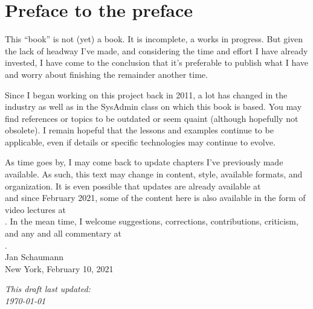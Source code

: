 \chapter{Preface to the preface}

This ``book'' is not (yet) a book.  It is incomplete,
a works in progress.  But given the lack of headway
I've made, and considering the time and effort I have
already invested, I have come to the conclusion that
it's preferable to publish what I have and worry about
finishing the remainder another time.

Since I began working on this project back in 2011, a
lot has changed in the industry as well as in the
SysAdmin class on which this book is based.  You may
find references or topics to be outdated or seem
quaint (although hopefully not obsolete).  I remain
hopeful that the lessons and examples continue to be
applicable, even if details or specific technologies
may continue to evolve.

As time goes by, I may come back to update chapters
I've previously made available.  As such, this text
may change in content, style, available formats, and
organization.  It is even possible that updates are
already available at \\
 and
since February 2021, some of the content here is also
available in the form of video lectures at \\
.
In the mean time, I welcome suggestions, corrections,
contributions, criticism, and any and all commentary at \\
.  \\

\noindent
Jan Schaumann \\
New York, February 10, 2021

\addvspace{.5in}
\noindent
{\em This draft last updated: \\
\today}
